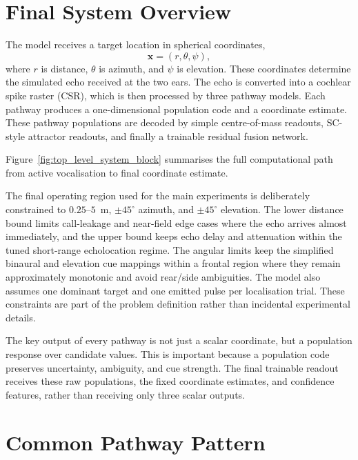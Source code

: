 \section{Final System Overview}

The model receives a target location in spherical coordinates,
\begin{equation}
    \mathbf{x} = (r,\theta,\psi),
\end{equation}
where $r$ is distance, $\theta$ is azimuth, and $\psi$ is elevation. These coordinates determine the simulated echo received at the two ears. The echo is converted into a cochlear spike raster (CSR), which is then processed by three pathway models. Each pathway produces a one-dimensional population code and a coordinate estimate. These pathway populations are decoded by simple centre-of-mass readouts, SC-style attractor readouts, and finally a trainable residual fusion network.



Figure~\ref{fig:top_level_system_block} summarises the full computational path from active vocalisation to final coordinate estimate.

The final operating region used for the main experiments is deliberately constrained to $0.25$--$5$~m, $\pm45^\circ$ azimuth, and $\pm45^\circ$ elevation. The lower distance bound limits call-leakage and near-field edge cases where the echo arrives almost immediately, and the upper bound keeps echo delay and attenuation within the tuned short-range echolocation regime. The angular limits keep the simplified binaural and elevation cue mappings within a frontal region where they remain approximately monotonic and avoid rear/side ambiguities. The model also assumes one dominant target and one emitted pulse per localisation trial. These constraints are part of the problem definition rather than incidental experimental details.

The key output of every pathway is not just a scalar coordinate, but a population response over candidate values. This is important because a population code preserves uncertainty, ambiguity, and cue strength. The final trainable readout receives these raw populations, the fixed coordinate estimates, and confidence features, rather than receiving only three scalar outputs.

\section{Common Pathway Pattern}

